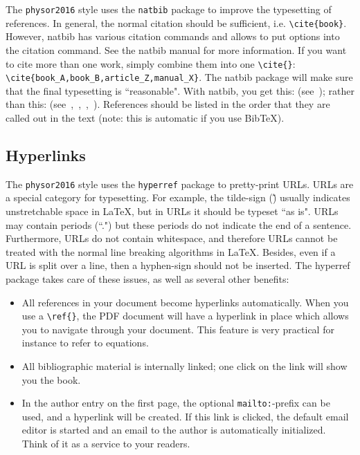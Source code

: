 \documentclass[12pt]{article}
\begin{document}
The \texttt{physor2016} style uses the \texttt{natbib} package to improve the typesetting of references. In general, the normal citation should be sufficient, i.e. \verb|\cite{book}|. However, natbib has various citation commands and allows to put options into the citation command. See the natbib manual for more information. If you want to cite more than one work, simply combine them into one \verb|\cite{}|: \verb|\cite{book_A,book_B,article_Z,manual_X}|. The natbib package will make sure that the final typesetting is ``reasonable". With natbib, you get this: (see~\cite{proc_paper,website,journal,book}); rather than this: (see~\cite{proc_paper},~\cite{website},~\cite{journal},~\cite{book}). References should be listed in the order that they are called out in the text (note: this is automatic if you use Bib\TeX).

%
\subsection{Hyperlinks} 
\label{subsect::hyper}

The \texttt{physor2016} style uses the \texttt{hyperref} package to pretty-print URLs. URLs are a special category for typesetting. For example, the tilde-sign (\~) usually indicates unstretchable space in LaTeX, but in URLs it should be typeset ``as is". URLs may contain periods (``.") but these periods do not indicate the end of a sentence. Furthermore, URLs do not contain whitespace, and therefore URLs cannot be treated with the normal line breaking algorithms in \LaTeX. Besides, even if a URL is split over a line, then a hyphen-sign should not be inserted. The hyperref package takes care of these issues, as well as several other benefits:

\begin{itemize}
\item All references in your document become hyperlinks automatically. When you use a \verb|\ref{}|, the PDF document will have a hyperlink in place which allows you to navigate through your document. This feature is very practical for instance to refer to equations.

\item All bibliographic material is internally linked; one click on the link will show you the book.

\item In the author entry on the first page, the optional \verb|mailto:|-prefix can be used, and a hyperlink will be created. If this link is clicked, the default email editor is started and an email to the author is automatically initialized. Think of it as a service to your readers.
\end{itemize}
\end{document}
